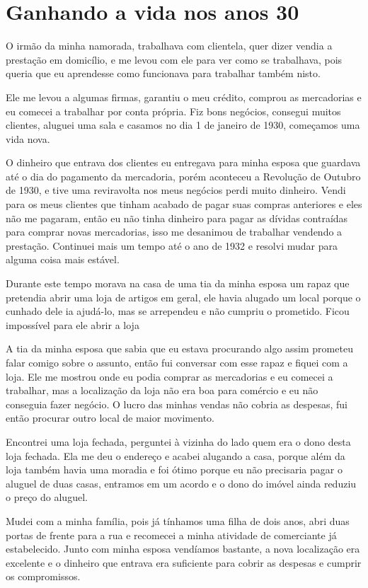 \chapter{Ganhando a vida nos anos 30}

O irmão da minha namorada, trabalhava com clientela, quer dizer vendia a
prestação em domicílio, e me levou com ele para ver como se trabalhava,
pois queria que eu aprendesse como funcionava para trabalhar também
nisto.

Ele me levou a algumas firmas, garantiu o meu crédito, comprou as
mercadorias e eu comecei a trabalhar por conta própria. Fiz bons
negócios, consegui muitos clientes, aluguei uma sala e casamos no dia 1
de janeiro de 1930, começamos uma vida nova.

O dinheiro que entrava dos clientes eu entregava para minha esposa que
guardava até o dia do pagamento da mercadoria, porém aconteceu a
Revolução de Outubro de 1930, e tive uma reviravolta nos meus negócios
perdi muito dinheiro. Vendi para os meus clientes que tinham acabado de
pagar suas compras anteriores e eles não me pagaram, então eu não tinha
dinheiro para pagar as dívidas contraídas para comprar novas
mercadorias, isso me desanimou de trabalhar vendendo a prestação.
Continuei mais um tempo até o ano de 1932 e resolvi mudar para alguma
coisa mais estável.

Durante este tempo morava na casa de uma tia da minha esposa um rapaz
que pretendia abrir uma loja de artigos em geral, ele havia alugado um
local porque o cunhado dele ia ajudá-lo, mas se arrependeu e não cumpriu
o prometido. Ficou impossível para ele abrir a loja

A tia da minha esposa que sabia que eu estava procurando algo assim
prometeu falar comigo sobre o assunto, então fui conversar com esse
rapaz e fiquei com a loja. Ele me mostrou onde eu podia comprar as
mercadorias e eu comecei a trabalhar, mas a localização da loja não era
boa para comércio e eu não conseguia fazer negócio. O lucro das minhas
vendas não cobria as despesas, fui então procurar outro local de maior
movimento.

Encontrei uma loja fechada, perguntei à vizinha do lado quem era o dono
desta loja fechada. Ela me deu o endereço e acabei alugando a casa,
porque além da loja também havia uma moradia e foi ótimo porque eu não
precisaria pagar o aluguel de duas casas, entramos em um acordo e o dono
do imóvel ainda reduziu o preço do aluguel.

Mudei com a minha família, pois já tínhamos uma filha de dois anos, abri
duas portas de frente para a rua e recomecei a minha atividade de
comerciante já estabelecido. Junto com minha esposa vendíamos bastante,
a nova localização era excelente e o dinheiro que entrava era suficiente
para cobrir as despesas e cumprir os compromissos.

